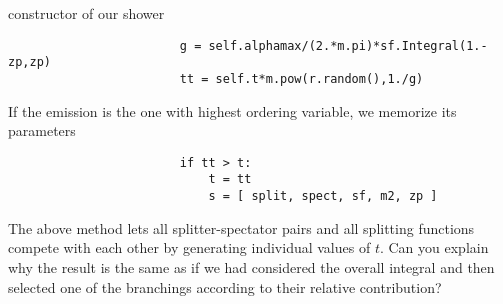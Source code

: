 \documentclass[10pt,fleqn]{scrartcl}
\begin{document}
constructor of our shower
\begin{verbatim}
                        g = self.alphamax/(2.*m.pi)*sf.Integral(1.-zp,zp)
                        tt = self.t*m.pow(r.random(),1./g)
\end{verbatim}
If the emission is the one with highest ordering variable, we memorize 
its parameters
\begin{verbatim}
                        if tt > t:
                            t = tt
                            s = [ split, spect, sf, m2, zp ]
\end{verbatim}
The above method lets all splitter-spectator pairs and all splitting functions
compete with each other by generating individual values of $t$. Can you explain 
why the result is the same as if we had considered the overall integral and then
selected one of the branchings according to their relative contribution?
 
\end{document}
